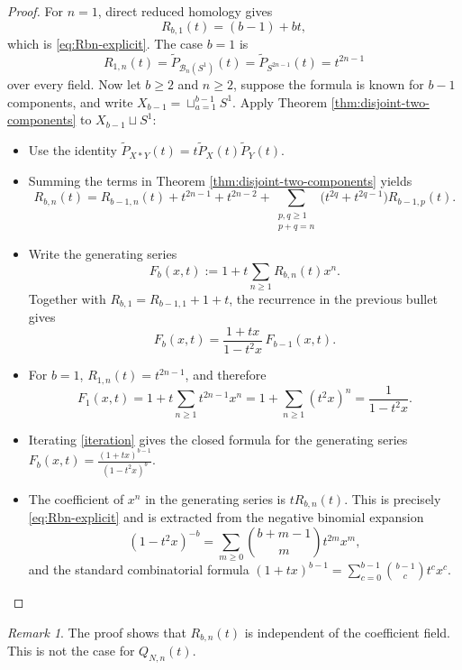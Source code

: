 \documentclass[11pt,a4paper]{article}
\numberwithin{equation}{section}
\theoremstyle{definition}
\theoremstyle{remark}
\newtheorem{rem}[thm]{Remark}
\newcommand{\wt}{\widetilde}
\newcommand{\BB}{\mathcal B}
\begin{document}
\begin{proof}
For \(n=1\), direct reduced homology gives
\[
R_{b,1}(t)=(b-1)+bt,
\]
which is \eqref{eq:Rbn-explicit}. The case \(b=1\) is
\[
R_{1,n}(t)=\wt P_{\BB_n(S^1)}(t)=\wt P_{S^{2n-1}}(t)=t^{2n-1}
\]
over every field. Now let \(b\ge2\) and \(n\ge2\), suppose the formula is
known for \(b-1\) components, and write
\(X_{b-1}=\sqcup_{a=1}^{b-1}S^1\). Apply Theorem
\ref{thm:disjoint-two-components} to \(X_{b-1}\sqcup S^1\):
\begin{itemize}
    \item Use the identity
$\displaystyle\wt P_{X*Y}(t)=t\wt P_X(t)\wt P_Y(t)$. 
\item Summing the terms in Theorem \ref{thm:disjoint-two-components} yields
\[
R_{b,n}(t)
=
R_{b-1,n}(t)
+t^{2n-1}+t^{2n-2}
+
\sum_{\substack{p,q\geq1\\p+q=n}}
\bigl(t^{2q}+t^{2q-1}\bigr)R_{b-1,p}(t).
\]
\item Write the generating series
\[
F_b(x,t)
:=
1+t\sum_{n\geq1}R_{b,n}(t)x^n.
\]
Together with \(R_{b,1}=R_{b-1,1}+1+t\), the recurrence in the previous
bullet gives
\begin{equation}\label{iteration}
F_b(x,t)
=
\frac{1+tx}{1-t^2x}\,F_{b-1}(x,t).
\end{equation}
\item For \(b=1\),
$R_{1,n}(t)=t^{2n-1}$, 
and therefore
$$ 
F_1(x,t)
=
1+t\sum_{n\geq1}t^{2n-1}x^n
=
1+\sum_{n\geq1}(t^2x)^n
=
\frac{1}{1-t^2x}.
$$
\item Iterating \eqref{iteration} gives the closed formula for the generating series
$\displaystyle 
F_b(x,t)
=
\frac{(1+tx)^{b-1}}{(1-t^2x)^b}.
$
\item The coefficient of $x^n$ in the generating series is $tR_{b,n}(t)$.  This is precisely \eqref{eq:Rbn-explicit} and is extracted from the negative binomial expansion
\[
(1-t^2x)^{-b}
=
\sum_{m\geq0}
\binom{b+m-1}{m}t^{2m}x^m,
\]
and the standard combinatorial formula
$\displaystyle 
(1+tx)^{b-1}
=
\sum_{c=0}^{b-1}
\binom{b-1}{c}t^c x^c
$. 
\end{itemize}
\end{proof}

\begin{rem}
    \rm The proof shows that $R_{b,n}(t)$ is independent of the coefficient field. This is not the case for $Q_{N,n}(t)$.
\end{rem}
\end{document}
